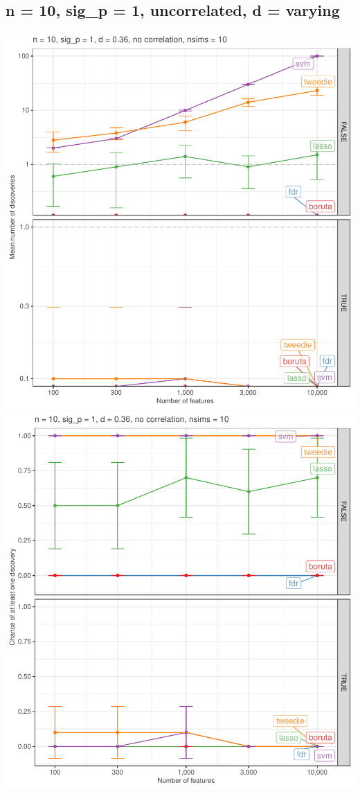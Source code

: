 \documentclass[
]{article}
\begin{document}
\hypertarget{n-10-sig_p-1-uncorrelated-d-varying}{%
\subsection{n = 10, sig\_p = 1, uncorrelated, d = varying}\label{n-10-sig_p-1-uncorrelated-d-varying}}

\begin{center}\includegraphics[width=0.49\linewidth]{main_files/figure-latex/unnamed-chunk-14-1} \includegraphics[width=0.49\linewidth]{main_files/figure-latex/unnamed-chunk-14-2} \end{center}
\end{document}
